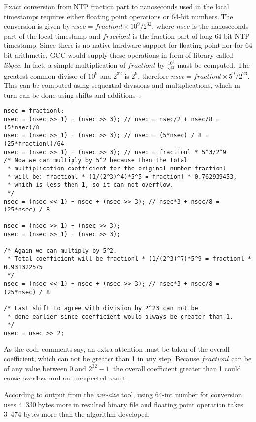 Exact conversion from NTP fraction part to nanoseconds used in the local timestamps
requires either floating point operations or 64-bit numbers.
The conversion is given by
$nsec = fractionl \times 10^9 / 2^{32}$, where $nsec$ is the nanoseconds part of the local timestamp
and $fractionl$ is the fraction part of long 64-bit NTP timestamp.
Since there is no native hardware support for floating point nor for 64 bit arithmetic,
GCC would supply these operations in form of library called {\it{libgcc}}.
In fact, a simple multiplication of $fractionl$ by $\frac{10^9}{2^{32}}$ must be computed.
The greatest common divisor of $10^9$ and $2^{32}$ is $2^9$,
therefore $nsec = fractionl \times 5^9 / 2^{23}$.
This can be computed using sequential divisions and multiplications,
which in turn can be done using shifts and additions~\cite{c99}.
\begin{lstlisting}
nsec = fractionl;
nsec = (nsec >> 1) + (nsec >> 3); // nsec = nsec/2 + nsec/8 = (5*nsec)/8
nsec = (nsec >> 1) + (nsec >> 3); // nsec = (5*nsec) / 8 = (25*fractionl)/64
nsec = (nsec >> 1) + (nsec >> 3); // nsec = fractionl * 5^3/2^9
/* Now we can multiply by 5^2 because then the total
 * multiplication coefficient for the original number fractionl
 * will be: fractionl * (1/(2^3)^4)*5^5 = fractionl * 0.762939453,
 * which is less then 1, so it can not overflow.
 */
nsec = (nsec << 1) + nsec + (nsec >> 3); // nsec*3 + nsec/8 = (25*nsec) / 8

nsec = (nsec >> 1) + (nsec >> 3);
nsec = (nsec >> 1) + (nsec >> 3);

/* Again we can multiply by 5^2.
 * Total coefficient will be fractionl * (1/(2^3)^7)*5^9 = fractionl * 0.931322575
 */
nsec = (nsec << 1) + nsec + (nsec >> 3); // nsec*3 + nsec/8 = (25*nsec) / 8

/* Last shift to agree with division by 2^23 can not be
 * done earlier since coefficient would always be greater than 1.
 */
nsec = nsec >> 2;
\end{lstlisting}
As the code comments say, an extra attention must be taken of the overall coefficient,
which can not be greater than 1 in any step.
Because $fractionl$ can be of any value between $0$ and $2^{32}-1$,
the overall coefficient greater than 1 could cause overflow and an unexpected result.

According to output from the {\it{avr-size}} tool, using 64-int number for conversion
uses 4~330 bytes more in %
resulted binary file
and floating point operation takes 3~474 bytes more
than the algorithm developed.

